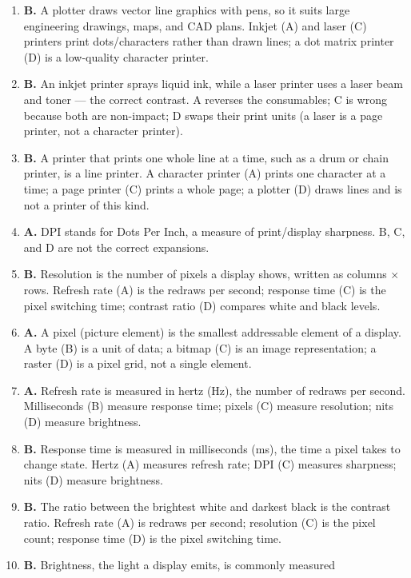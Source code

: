 \documentclass[11pt]{article}
\begin{document}
\begin{enumerate}[label=\textbf{Q\arabic*.}, leftmargin=*]
  matrix, spraying ink (C) is inkjet, and melting toner (D) is laser --- all
  two-dimensional paper printing.
\item \textbf{B.} A plotter draws vector line graphics with pens, so it suits
  large engineering drawings, maps, and CAD plans. Inkjet (A) and laser (C)
  printers print dots/characters rather than drawn lines; a dot matrix printer
  (D) is a low-quality character printer.
\item \textbf{B.} An inkjet printer sprays liquid ink, while a laser printer
  uses a laser beam and toner --- the correct contrast. A reverses the
  consumables; C is wrong because both are non-impact; D swaps their print
  units (a laser is a page printer, not a character printer).
\item \textbf{B.} A printer that prints one whole line at a time, such as a
  drum or chain printer, is a line printer. A character printer (A) prints one
  character at a time; a page printer (C) prints a whole page; a plotter (D)
  draws lines and is not a printer of this kind.
\item \textbf{A.} DPI stands for Dots Per Inch, a measure of print/display
  sharpness. B, C, and D are not the correct expansions.
\item \textbf{B.} Resolution is the number of pixels a display shows,
  written as columns $\times$ rows. Refresh rate (A) is the redraws per
  second; response time (C) is the pixel switching time; contrast ratio (D)
  compares white and black levels.
\item \textbf{A.} A pixel (picture element) is the smallest addressable
  element of a display. A byte (B) is a unit of data; a bitmap (C) is an
  image representation; a raster (D) is a pixel grid, not a single element.
\item \textbf{A.} Refresh rate is measured in hertz (Hz), the number of
  redraws per second. Milliseconds (B) measure response time; pixels (C)
  measure resolution; nits (D) measure brightness.
\item \textbf{B.} Response time is measured in milliseconds (ms), the time a
  pixel takes to change state. Hertz (A) measures refresh rate; DPI (C)
  measures sharpness; nits (D) measure brightness.
\item \textbf{B.} The ratio between the brightest white and darkest black is
  the contrast ratio. Refresh rate (A) is redraws per second; resolution (C)
  is the pixel count; response time (D) is the pixel switching time.
\item \textbf{B.} Brightness, the light a display emits, is commonly measured

\end{enumerate}
\end{document}
